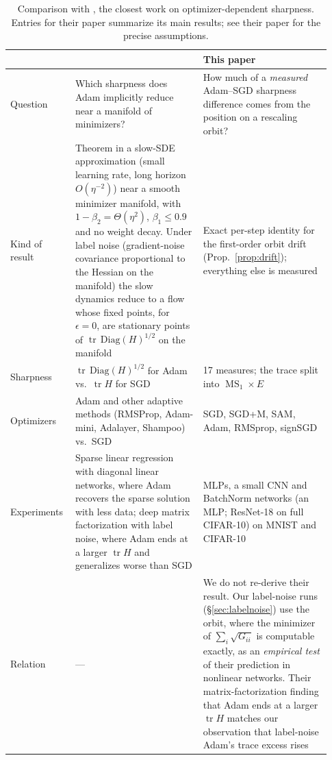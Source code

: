 \documentclass[10pt]{article}
\theoremstyle{remark}
\newcommand{\tr}{\operatorname{tr}}
\newcommand{\MS}{\operatorname{MS}}
\begin{document}
\begin{table}[t]
\centering
\small
\caption{Comparison with \citet{li2025adam}, the closest work on optimizer-dependent sharpness. Entries for their paper summarize its main results; see their paper for the precise assumptions.}
\label{tab:li}
\begin{tabular}{@{}p{0.17\linewidth}p{0.38\linewidth}p{0.38\linewidth}@{}}
\toprule
& \citet{li2025adam} & This paper\\
\midrule
Question & Which sharpness does Adam implicitly reduce near a manifold of minimizers? & How much of a \emph{measured} Adam--SGD sharpness difference comes from the position on a rescaling orbit?\\
Kind of result & Theorem in a slow-SDE approximation (small learning rate, long horizon $O(\eta^{-2})$) near a smooth minimizer manifold, with $1-\beta_2=\Theta(\eta^2)$, $\beta_1\le0.9$ and no weight decay. Under label noise (gradient-noise covariance proportional to the Hessian on the manifold) the slow dynamics reduce to a flow whose fixed points, for $\epsilon=0$, are stationary points of $\tr\,\mathrm{Diag}(H)^{1/2}$ on the manifold & Exact per-step identity for the first-order orbit drift (Prop.~\ref{prop:drift}); everything else is measured\\
Sharpness & $\tr\,\mathrm{Diag}(H)^{1/2}$ for Adam vs.\ $\tr H$ for SGD & 17 measures; the trace split into $\MS_1\times E$\\
Optimizers & Adam and other adaptive methods (RMSProp, Adam-mini, Adalayer, Shampoo) vs.\ SGD & SGD, SGD+M, SAM, Adam, RMSprop, signSGD\\
Experiments & Sparse linear regression with diagonal linear networks, where Adam recovers the sparse solution with less data; deep matrix factorization with label noise, where Adam ends at a larger $\tr H$ and generalizes worse than SGD & MLPs, a small CNN and BatchNorm networks (an MLP; ResNet-18 on full CIFAR-10) on MNIST and CIFAR-10\\
Relation & --- & We do not re-derive their result. Our label-noise runs (\S\ref{sec:labelnoise}) use the orbit, where the minimizer of $\sum_i\sqrt{G_{ii}}$ is computable exactly, as an \emph{empirical test} of their prediction in nonlinear networks. Their matrix-factorization finding that Adam ends at a larger $\tr H$ matches our observation that label-noise Adam's trace excess rises\\
\bottomrule
\end{tabular}
\end{table}
\end{document}
